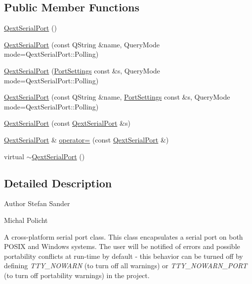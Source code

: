 \subsection*{Public Member Functions}
\begin{DoxyCompactItemize}
\item 
\mbox{\hyperlink{class_qext_serial_port_a6aba59fc97222d64653f94c491747ffd}{Qext\+Serial\+Port}} ()
\item 
\mbox{\hyperlink{class_qext_serial_port_ada4e210fc8b01ffee3f91847751a5e0f}{Qext\+Serial\+Port}} (const Q\+String \&name, Query\+Mode mode=Qext\+Serial\+Port\+::\+Polling)
\item 
\mbox{\hyperlink{class_qext_serial_port_a08fc39acb695564a8672d544915ccccf}{Qext\+Serial\+Port}} (\mbox{\hyperlink{struct_port_settings}{Port\+Settings}} const \&s, Query\+Mode mode=Qext\+Serial\+Port\+::\+Polling)
\item 
\mbox{\hyperlink{class_qext_serial_port_aa8272c9478e2cc8b3741e538179dc57b}{Qext\+Serial\+Port}} (const Q\+String \&name, \mbox{\hyperlink{struct_port_settings}{Port\+Settings}} const \&s, Query\+Mode mode=Qext\+Serial\+Port\+::\+Polling)
\item 
\mbox{\hyperlink{class_qext_serial_port_a207af0672a6a954e6621933e93b9923e}{Qext\+Serial\+Port}} (const \mbox{\hyperlink{class_qext_serial_port}{Qext\+Serial\+Port}} \&s)
\item 
\mbox{\hyperlink{class_qext_serial_port}{Qext\+Serial\+Port}} \& \mbox{\hyperlink{class_qext_serial_port_a00aa39b59db50b6fe07bc222b4227f84}{operator=}} (const \mbox{\hyperlink{class_qext_serial_port}{Qext\+Serial\+Port}} \&)
\item 
virtual \mbox{\hyperlink{class_qext_serial_port_a0712978a092762f69f308df7372e3f7a}{$\sim$\+Qext\+Serial\+Port}} ()
\end{DoxyCompactItemize}


\subsection{Detailed Description}
\begin{DoxyAuthor}{Author}
Stefan Sander 

Michal Policht
\end{DoxyAuthor}
A cross-\/platform serial port class. This class encapsulates a serial port on both P\+O\+S\+IX and Windows systems. The user will be notified of errors and possible portability conflicts at run-\/time by default -\/ this behavior can be turned off by defining {\itshape T\+T\+Y\+\_\+\+N\+O\+W\+A\+RN} (to turn off all warnings) or {\itshape T\+T\+Y\+\_\+\+N\+O\+W\+A\+R\+N\+\_\+\+P\+O\+RT} (to turn off portability warnings) in the project.

